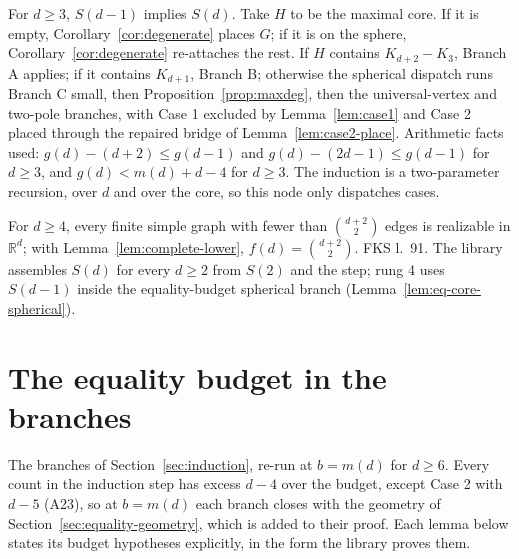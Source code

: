 \begin{lemma}
  \label{lem:step}
  \leanok
  For $d \ge 3$, $S(d-1)$ implies $S(d)$. Take $H$ to be the maximal core. If it is empty,
  Corollary~\ref{cor:degenerate} places $G$; if it is on the sphere,
  Corollary~\ref{cor:degenerate} re-attaches the rest. If $H$ contains $K_{d+2} - K_3$,
  Branch A applies; if it contains $K_{d+1}$, Branch B; otherwise the spherical dispatch runs
  Branch C small, then Proposition~\ref{prop:maxdeg}, then the universal-vertex and
  two-pole branches, with Case 1 excluded by Lemma~\ref{lem:case1} and Case 2 placed through
  the repaired bridge of Lemma~\ref{lem:case2-place}. Arithmetic facts used:
  $g(d) - (d + 2) \le g(d-1)$ and $g(d) - (2d - 1) \le g(d-1)$ for $d \ge 3$, and
  $g(d) < m(d) + d - 4$ for $d \ge 3$. The induction is a two-parameter recursion, over $d$
  and over the core, so this node only dispatches cases.
\end{lemma}

\begin{theorem}
  \label{thm:fks}
  \leanok
  For $d \ge 4$, every finite simple graph with fewer than $\binom{d+2}{2}$ edges is
  realizable in $\mathbb{R}^d$; with Lemma~\ref{lem:complete-lower}, $f(d) = \binom{d+2}{2}$.
  FKS l.~91. The library assembles $S(d)$ for every $d \ge 2$ from $S(2)$ and the step;
  rung 4 uses $S(d-1)$ inside the equality-budget spherical branch
  (Lemma~\ref{lem:eq-core-spherical}).
\end{theorem}

\section{The equality budget in the branches}
\label{sec:equality-budget}

The branches of Section~\ref{sec:induction}, re-run at $b = m(d)$ for $d \ge 6$. Every count
in the induction step has excess $d - 4$ over the budget, except Case 2 with $d - 5$ (A23),
so at $b = m(d)$ each branch closes with the geometry of
Section~\ref{sec:equality-geometry}, which is added to their proof. Each lemma below states
its budget hypotheses explicitly, in the form the library proves them.

